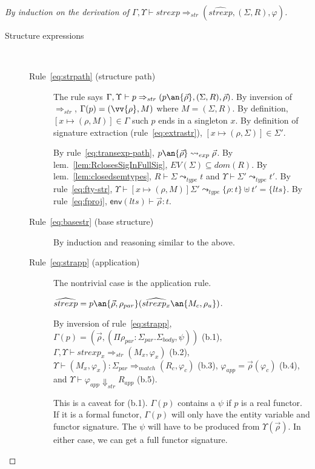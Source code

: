 \begin{proof}[By induction on the derivation of $\Gamma,\Upsilon\vdash
  strexp \Rightarrow_{str} (\widehat{strexp}, (\Sigma,R),\varphi)$]
\begin{description}
\item[Structure expressions]~
\begin{description}
\item[Rule~\ref{eq:strpath} (structure path)] The rule says
  $\Gamma,\Upsilon\vdash p \Rightarrow_{str}
  (p\an{\vec{\rho}},(\Sigma,R),\vec{\rho})$. 
  By inversion of
  $\Rightarrow_{str}$, $\Gamma(p) = (\vv{\rho}, M)$ where
  $M=(\Sigma,R)$. 
  By definition,
  $[x\mapsto(\rho, M)]\in\Gamma$ such $p$ ends in a singleton
  $x$. 
  By definition of
  signature extraction (rule~\ref{eq:extrastr}),
  $[x\mapsto(\rho,\Sigma)]\in\Sigma'$. 
 
By rule~\ref{eq:transexp-path}, $
  p\an{\vec{\rho}}\leadsto_{exp} \vec{\rho}$.
By lem.~\ref{lem:RclosesSigInFullSig}, $EV(\Sigma)\subseteq dom(R)$. 
By lem.~\ref{lem:closedsemtypes}, $R\vdash\Sigma\leadsto_{type} t$ and
$\Upsilon\vdash\Sigma'\leadsto_{type} t'$. 
By rule~\ref{eq:fty-str},   
$\Upsilon\vdash[x\mapsto(\rho,M)]\Sigma' \leadsto_{type} \{\rho:t\}
\uplus t' = \{lts\}$. 
By rule~\ref{eq:fproj}, $\mathsf{env}(lts)\vdash \vec{\rho} : t$. 

\item[Rule~\ref{eq:basestr} (base structure)] By induction and
  reasoning similar to the above. 

\item[Rule~\ref{eq:strapp} (application)] The nontrivial case is the
  application rule. 

$\widehat{strexp} = p\an{\vec{\rho},\rho_{par}}
(\widehat{strexp_x}\an{M_c,\rho_u})$. 

By inversion of
  rule~\ref{eq:strapp}, $\Gamma(p) = (\vec{\rho},(\Pi
  \rho_{par}:\Sigma_{par}.\Sigma_{body},\psi))$ (b.1), 
$\Gamma,\Upsilon\vdash strexp_x
  \Rightarrow_{str} (M_x,\varphi_x)$ (b.2), 
$\Upsilon\vdash(M_x,\varphi_x):\Sigma_{par}
  \Rightarrow_{match} (R_c,\varphi_c)$ (b.3), 
$\varphi_{app} =
  \vec{\rho}(\varphi_c)$ (b.4), and
  $\Upsilon\vdash\varphi_{app}\Downarrow_{str} R_{app}$ (b.5).
  
This is a caveat for (b.1). $\Gamma(p)$ contains a $\psi$ if $p$ is a
real functor. If it is a formal functor, $\Gamma(p)$ will only have
the entity variable and functor signature. The $\psi$ will have to be
produced from $\Upsilon(\vec{\rho})$. In either case, we can get a
full functor signature. 


\end{description}
\end{description}
\end{proof}
